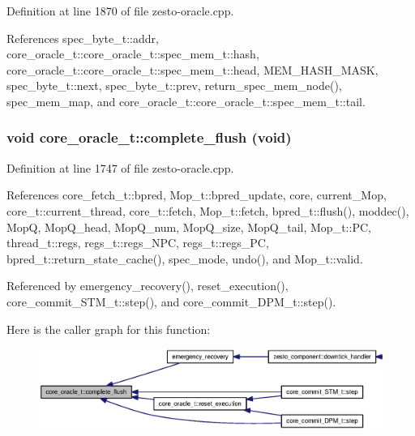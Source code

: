 Definition at line 1870 of file zesto-oracle.cpp.

References spec\_\-byte\_\-t::addr, core\_\-oracle\_\-t::core\_\-oracle\_\-t::spec\_\-mem\_\-t::hash, core\_\-oracle\_\-t::core\_\-oracle\_\-t::spec\_\-mem\_\-t::head, MEM\_\-HASH\_\-MASK, spec\_\-byte\_\-t::next, spec\_\-byte\_\-t::prev, return\_\-spec\_\-mem\_\-node(), spec\_\-mem\_\-map, and core\_\-oracle\_\-t::core\_\-oracle\_\-t::spec\_\-mem\_\-t::tail.
\subsubsection[{complete\_\-flush}]{\setlength{\rightskip}{0pt plus 5cm}void core\_\-oracle\_\-t::complete\_\-flush (void)}\label{classcore__oracle__t_9f125e90b225555a2632277161f3b27c}




Definition at line 1747 of file zesto-oracle.cpp.

References core\_\-fetch\_\-t::bpred, Mop\_\-t::bpred\_\-update, core, current\_\-Mop, core\_\-t::current\_\-thread, core\_\-t::fetch, Mop\_\-t::fetch, bpred\_\-t::flush(), moddec(), MopQ, MopQ\_\-head, MopQ\_\-num, MopQ\_\-size, MopQ\_\-tail, Mop\_\-t::PC, thread\_\-t::regs, regs\_\-t::regs\_\-NPC, regs\_\-t::regs\_\-PC, bpred\_\-t::return\_\-state\_\-cache(), spec\_\-mode, undo(), and Mop\_\-t::valid.

Referenced by emergency\_\-recovery(), reset\_\-execution(), core\_\-commit\_\-STM\_\-t::step(), and core\_\-commit\_\-DPM\_\-t::step().

Here is the caller graph for this function:\nopagebreak
\begin{figure}[H]
\begin{center}
\leavevmode
\includegraphics[width=420pt]{classcore__oracle__t_9f125e90b225555a2632277161f3b27c_icgraph}
\end{center}
\end{figure}

